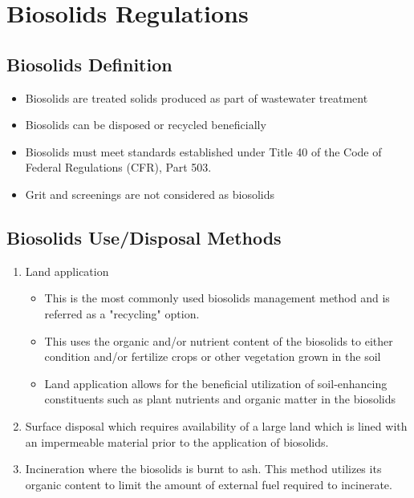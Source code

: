 
\chapter{Biosolids Regulations}

\section{Biosolids Definition}

		\begin{itemize}
			\item Biosolids are treated solids produced as part of wastewater treatment
			\item Biosolids can be disposed or recycled beneficially
			\item Biosolids must meet standards established under Title 40 of the Code of Federal Regulations (CFR), Part 503.  
			\item Grit and screenings are not considered as biosolids
		\end{itemize}
	
\section{Biosolids Use/Disposal Methods}
	
			\begin{enumerate}[1.]
				\item Land application
					\begin{itemize}
						\item This is the most commonly used biosolids management method and is referred as a "recycling" option.
						\item This uses the organic and/or nutrient content of the biosolids to either condition and/or fertilize crops or other vegetation grown in the soil
						\item Land application allows for the beneficial utilization of soil-enhancing constituents such as plant nutrients and organic matter in the biosolids
					\end{itemize}
				\item Surface disposal which requires availability of a large land which is lined with an impermeable material prior to the application of biosolids. 
				\item Incineration where the biosolids is burnt to ash.  This method utilizes its organic content to limit the amount of external fuel required to incinerate.  
			\end{enumerate}

